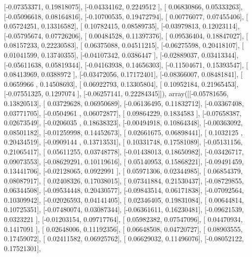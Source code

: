 \documentclass{article}
\begin{document}
       [-0.07353371,  0.19818075],
       [-0.04334162,  0.2249512 ],
       [ 0.06830866,  0.05333263],
       [-0.05096618,  0.08164816],
       [-0.10700535,  0.19472794],
       [ 0.00776077,  0.07455406],
       [ 0.05724251,  0.13316582],
       [ 0.10782415,  0.08589735],
       [-0.03979813,  0.12023114],
       [-0.05795674,  0.07726206],
       [ 0.00484528,  0.11397376],
       [ 0.09536404,  0.18847027],
       [ 0.08157233,  0.22230583],
       [ 0.06375088,  0.04511215],
       [-0.06275598,  0.20418107],
       [ 0.01041599,  0.13740355],
       [-0.04107342,  0.0386447 ],
       [-0.02889037,  0.03413344],
       [-0.05611638,  0.05819344],
       [-0.04163938,  0.14656303],
       [-0.11504671,  0.15393547],
       [ 0.08413969,  0.0388972 ],
       [-0.03472056,  0.17172401],
       [-0.08366007,  0.08481841],
       [ 0.0659966 ,  0.14508693],
       [ 0.06922793,  0.13305804],
       [ 0.10952184,  0.21965453],
       [-0.07551325,  0.1297074 ],
       [-0.06257141,  0.22284345]]), array([[-0.05781656,  0.13820513],
       [ 0.03729628,  0.06950689],
       [-0.06136495,  0.11832712],
       [-0.03367408,  0.03771705],
       [-0.0504961 ,  0.06072877],
       [ 0.09864229,  0.1834583 ],
       [-0.07658387,  0.02673549],
       [-0.0206035 ,  0.18638323],
       [-0.00494918,  0.10864348],
       [-0.00363092,  0.08501182],
       [-0.01259998,  0.14452673],
       [ 0.02661675,  0.06898441],
       [ 0.1032125 ,  0.20434519],
       [-0.0909144 ,  0.13713531],
       [ 0.10331748,  0.17581089],
       [-0.05131156,  0.21065417],
       [ 0.05611255,  0.03748778],
       [-0.01438013,  0.18650982],
       [-0.03426717,  0.09073553],
       [-0.08629291,  0.10119616],
       [ 0.05140953,  0.15868221],
       [-0.09491459,  0.13441706],
       [-0.02128065,  0.0922991 ],
       [ 0.05971306,  0.02344985],
       [ 0.06854379,  0.08087917],
       [ 0.02408326,  0.17038015],
       [ 0.07341884,  0.21530437],
       [-0.08729855,  0.06344508],
       [-0.09534448,  0.20430577],
       [-0.09843514,  0.06171838],
       [-0.07092564,  0.10309942],
       [-0.02026593,  0.04141405],
       [ 0.02346405,  0.19831084],
       [ 0.00644814,  0.10725351],
       [-0.07480074,  0.03087344],
       [-0.06361611,  0.16230481],
       [-0.09621539,  0.0323221 ],
       [-0.01203154,  0.09717764],
       [ 0.05982382,  0.07547096],
       [ 0.04470934,  0.1417091 ],
       [ 0.02648006,  0.11192356],
       [ 0.06648508,  0.04720727],
       [ 0.08903555,  0.17459072],
       [ 0.02411582,  0.06925762],
       [ 0.06629032,  0.11496076],
       [-0.08052122,  0.17521301],
\end{document}
